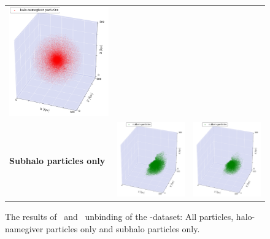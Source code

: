 \begin{subfigures}
\begin{figure}[!htbp]
{\begin{tabular}{|p{.5cm} c c|}
			{\includegraphics[width = .42\textwidth]{images/dice-two/dice-two-halo-only-nosaddle.png}} \hspace*{-1em}		\\
			\begin{sideways}{ \hspace{2cm}\textbf{Subhalo particles only} }\end{sideways}	 \hspace*{-1em}			 &
			{\includegraphics[width = .42\textwidth]{images/dice-two/dice-two-plot-subhalo-phew.png}} &
			{\includegraphics[width = .42\textwidth]{images/dice-two/dice-two-plot-subhalo-nosaddle.png}} \\
			\hline
		\end{tabular}
		\caption{\label{fig:dice_two_results_a}The results of \phewon\ and \simple\ unbinding of the \dt-dataset: All particles, halo-namegiver particles only and subhalo particles only.}
}
\end{figure}
\end{subfigures}
